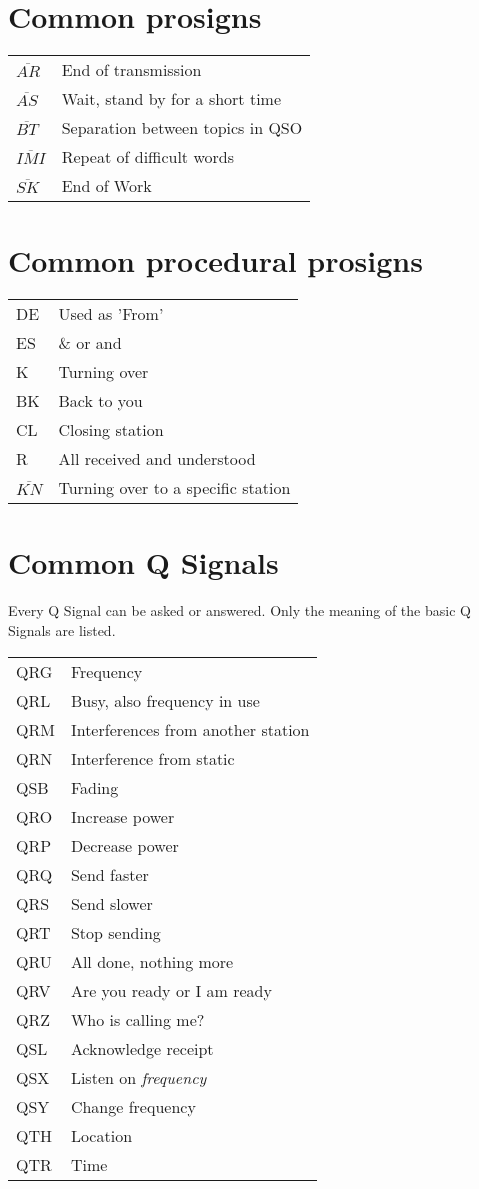 \documentclass[10pt]{article}
\begin{document}
\begin{multicols}{3}
\section{Common prosigns}
\vspace{\baselineskip}
\begin{tabular}{ll}
$\overline{AR}$ & End of transmission\\
$\overline{AS}$ & Wait, stand by for a short time\\
$\overline{BT}$ & Separation between topics in QSO\\
$\overline{IMI}$ & Repeat of difficult words\\
$\overline{SK}$ & End of Work\\
\end{tabular}

\section{Common procedural prosigns}
\vspace{\baselineskip}
\begin{tabular}{ll}
DE & Used as 'From'\\
ES & \& or and\\
K & Turning over\\
BK & Back to you\\
CL & Closing station\\
R & All received and understood\\
$\overline{KN}$ & Turning over to a specific station\\
\end{tabular}
\section{Common Q Signals}
\vspace{\baselineskip}
Every Q Signal can be asked or answered. Only the meaning of the basic Q Signals are listed.
\begin{tabular}{ll}
QRG & Frequency\\
QRL & Busy, also frequency in use\\
QRM & Interferences from another station\\
QRN & Interference from static\\
QSB & Fading\\
QRO & Increase power\\
QRP & Decrease power\\
QRQ & Send faster\\
QRS & Send slower\\
QRT & Stop sending\\
QRU & All done, nothing more\\
QRV & Are you ready or I am ready\\
QRZ & Who is calling me?\\
QSL & Acknowledge receipt\\
QSX & Listen on \textit{frequency}\\
QSY & Change frequency\\
QTH & Location\\
QTR & Time\\
\end{tabular}



\end{multicols}
\end{document}
